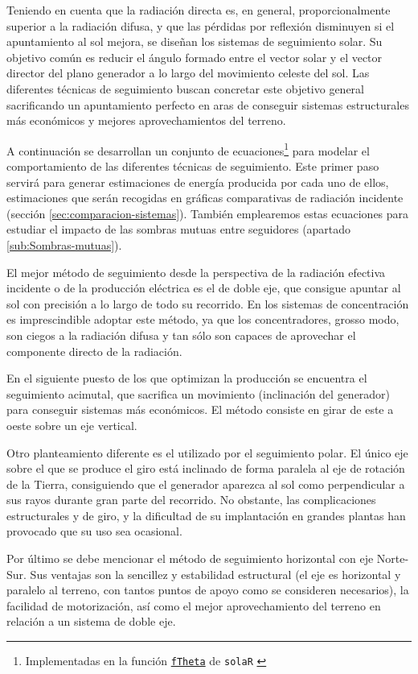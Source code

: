 Teniendo en cuenta que la radiación directa es, en general,
proporcionalmente superior a la radiación difusa, y que las pérdidas
por reflexión disminuyen si el apuntamiento al sol mejora, se diseñan
los sistemas de seguimiento solar. Su objetivo común es reducir el
ángulo formado entre el vector solar y el vector director del plano
generador a lo largo del movimiento celeste del sol. Las diferentes
técnicas de seguimiento buscan concretar este objetivo general
sacrificando un apuntamiento perfecto en aras de conseguir sistemas
estructurales más económicos y mejores aprovechamientos del terreno.

A continuación se desarrollan un conjunto de
ecuaciones\footnote{Implementadas en la función
  \href{http://search.r-project.org/R/library/solaR/html/fTheta.html}{\texttt{fTheta}}
  de \texttt{solaR} \cite{Perpinan2012b}} para modelar el
comportamiento de las diferentes técnicas de seguimiento. Este primer
paso servirá para generar estimaciones de energía producida por cada
uno de ellos, estimaciones que serán recogidas en gráficas
comparativas de radiación incidente (sección
\ref{sec:comparacion-sistemas}).  También emplearemos estas ecuaciones
para estudiar el impacto de las sombras mutuas entre seguidores
(apartado \ref{sub:Sombras-mutuas}).

El mejor método de seguimiento desde la perspectiva de la radiación
efectiva incidente o de la producción eléctrica es el de doble eje,
que consigue apuntar al sol con precisión a lo largo de todo su
recorrido. En los sistemas de concentración es imprescindible adoptar
este método, ya que los concentradores, grosso modo, son ciegos a la
radiación difusa y tan sólo son capaces de aprovechar el componente
directo de la radiación.

En el siguiente puesto de los que optimizan la producción se encuentra
el seguimiento acimutal, que sacrifica un movimiento (inclinación del
generador) para conseguir sistemas más económicos. El método consiste
en girar de este a oeste sobre un eje vertical. 

Otro planteamiento diferente es el utilizado por el seguimiento
polar. El único eje sobre el que se produce el giro está inclinado de
forma paralela al eje de rotación de la Tierra, consiguiendo que el
generador aparezca al sol como perpendicular a sus rayos durante gran
parte del recorrido. No obstante, las complicaciones estructurales y
de giro, y la dificultad de su implantación en grandes plantas han
provocado que su uso sea ocasional.

Por último se debe mencionar el método de seguimiento horizontal con
eje Norte-Sur. Sus ventajas son la sencillez y estabilidad estructural
(el eje es horizontal y paralelo al terreno, con tantos puntos de
apoyo como se consideren necesarios), la facilidad de motorización,
así como el mejor aprovechamiento del terreno en relación a un sistema
de doble eje.


